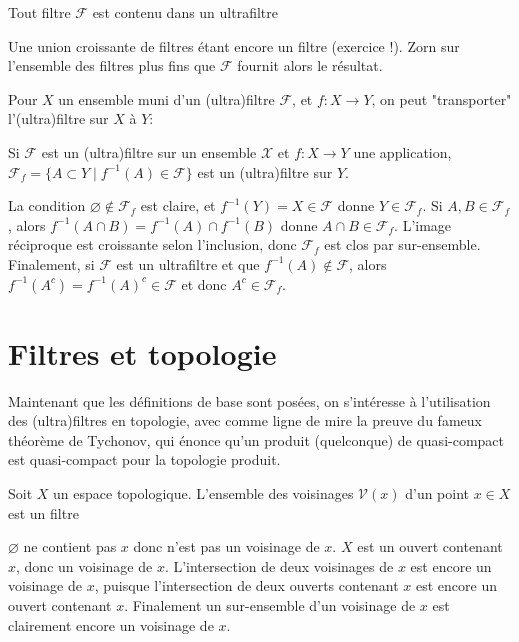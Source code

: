 \documentclass{article}
\begin{document}
\begin{proposition}
    Tout filtre $\mathcal{F}$ est contenu dans un ultrafiltre
\end{proposition}

\begin{preuve}
    Une union croissante de filtres étant encore un filtre (exercice !). Zorn sur l'ensemble des filtres plus fins que $\mathcal{F}$ fournit alors le résultat.\\
\end{preuve}

Pour $X$ un ensemble muni d'un (ultra)filtre $\mathcal{F}$, et $f: X \to Y$, on peut "transporter" l'(ultra)filtre sur $X$ à $Y$:
\begin{proposition}
    Si $\mathcal{F}$ est un (ultra)filtre sur un ensemble $\mathcal{X}$ et $f: X \to Y$ une application, $\mathcal{F}_f = \{A \subset Y \mid f^{-1}(A) \in \mathcal{F}\}$ est un (ultra)filtre sur $Y$.
\end{proposition}

\begin{preuve}
    La condition $\varnothing \not\in \mathcal{F}_f$ est claire, et $f^{-1}(Y) = X \in \mathcal{F}$ donne $Y \in \mathcal{F}_f$. Si $A, B \in \mathcal{F}_f$, alors $f^{-1}(A \cap B) = f^{-1}(A) \cap f^{-1}(B)$ donne $A \cap B \in \mathcal{F}_f$. L'image réciproque est croissante selon l'inclusion, donc $\mathcal{F}_f$ est clos par sur-ensemble. Finalement, si $\mathcal{F}$ est un ultrafiltre et que $f^{-1}(A) \not \in \mathcal{F}$, alors $f^{-1}(A^c) = f^{-1}(A)^c \in \mathcal{F}$ et donc $A^c \in \mathcal{F}_f$.
\end{preuve}

\section{Filtres et topologie}
Maintenant que les définitions de base sont posées, on s'intéresse à l'utilisation des (ultra)filtres en topologie, avec comme ligne de mire la preuve du fameux théorème de Tychonov, qui énonce qu'un produit (quelconque) de quasi-compact est quasi-compact pour la topologie produit.
\begin{proposition}
    Soit $X$ un espace topologique. L'ensemble des voisinages $\mathcal{V}(x)$ d'un point $x \in X$ est un filtre
\end{proposition}
\begin{preuve}
    $\varnothing$ ne contient pas $x$ donc n'est pas un voisinage de $x$. $X$ est un ouvert contenant $x$, donc un voisinage de $x$. L'intersection de deux voisinages de $x$ est encore un voisinage de $x$, puisque l'intersection de deux ouverts contenant $x$ est encore un ouvert contenant $x$. Finalement un sur-ensemble d'un voisinage de $x$ est clairement encore un voisinage de $x$.\\
\end{preuve}
\end{document}
